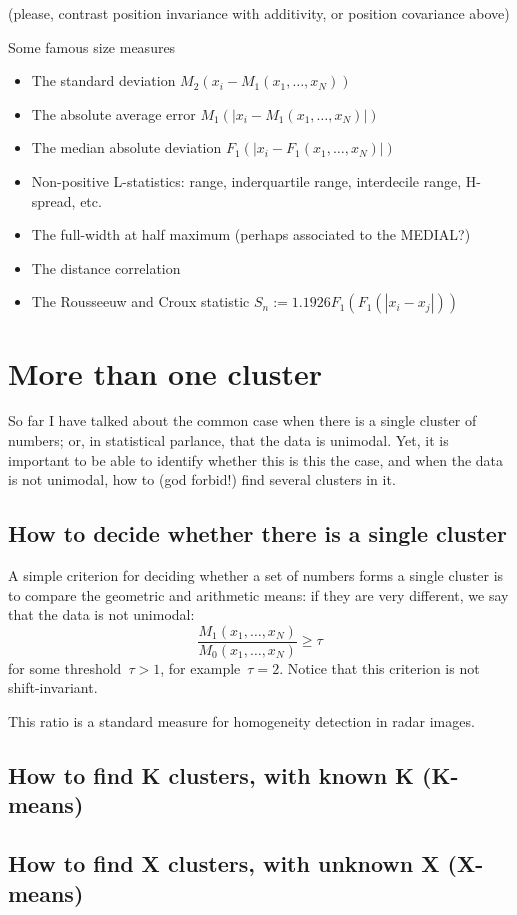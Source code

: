 (please, contrast position invariance with additivity, or position
covariance above)

Some famous size measures
\begin{itemize}
	\item The standard deviation $M_2(x_i-M_1(x_1,\ldots,x_N))$
	\item The absolute average error $M_1(|x_i-M_1(x_1,\ldots,x_N)|)$
	\item The median absolute deviation $F_1(|x_i-F_1(x_1,\ldots,x_N)|)$
	\item Non-positive L-statistics: range, inderquartile range,
		interdecile range, H-spread, etc.
	\item The full-width at half maximum (perhaps associated to the
		MEDIAL?)
	\item The distance correlation
	\item The Rousseeuw and Croux statistic $S_n := 1.1926
		F_1(F_1(|x_i-x_j|))$
\end{itemize}

\clearpage
\section{More than one cluster}

So far I have talked about the common case when there is a single
cluster of numbers; or, in statistical parlance, that the data is
unimodal.  Yet, it is important to be able to identify whether this
is this the case, and when the data is not unimodal, how to (god
forbid!) find several clusters in it.

\subsection{How to decide whether there is a single cluster}

A simple criterion for deciding whether a set of numbers forms a
single cluster is to compare the geometric and arithmetic means: if
they are very different, we say that the data is not unimodal:
\[
	\frac{M_1(x_1,\ldots,x_N)}{M_0(x_1,\ldots,x_N)} \ge \tau
\]
for some threshold~$\tau>1$, for example~$\tau=2$.  Notice that this
criterion is not shift-invariant.

This ratio is a standard measure for homogeneity detection in radar
images.

\subsection{How to find K clusters, with known K (K-means)}

\subsection{How to find X clusters, with unknown X (X-means)}




